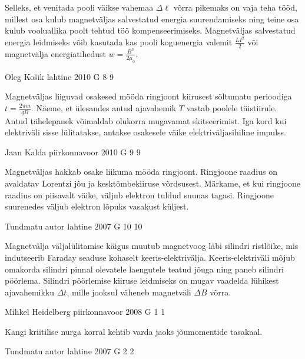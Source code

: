 \documentclass[11pt]{article}
\begin{document}
{{\ifHint
Selleks, et venitada pooli väikse vahemaa $\Delta \ell$ võrra pikemaks on vaja teha tööd, millest osa kulub magnetväljas salvestatud energia suurendamiseks ning teine osa kulub vooluallika poolt tehtud töö kompenseerimiseks. Magnetväljas salvestatud energia leidmiseks võib kasutada kas pooli koguenergia valemit $\frac{LI^2}{2}$ või magnetvälja energiatihedust $w = \frac{B^2}{2\mu_0}$.
\fi
}

{Oleg Košik} %
{lahtine} %
{2010} %
{G 8} %
{9} %
{

\ifHint
Magnetväljas liiguvad osakesed mööda ringjoont kiirusest sõltumatu perioodiga $t = \frac{2\pi m}{qB}$. Näeme, et ülesandes antud ajavahemik $T$ vastab poolele täistiirule. Antud tähelepanek võimaldab olukorra mugavamat skitseerimist. Iga kord kui elektriväli sisse lülitatakse, antakse osakesele väike elektriväljasihiline impulss.
\fi
}

{Jaan Kalda} %
{piirkonnavoor} %
{2010} %
{G 9} %
{9} %
{

\ifHint
Magnetväljas hakkab osake liikuma mööda ringjoont. Ringjoone raadius on avaldatav Lorentzi jõu ja kesktõmbekiiruse võrdsusest.
Märkame, et kui ringjoone raadius on piisavalt väike, väljub elektron tuldud suunas tagasi. Ringjoone suurenedes väljub elektron lõpuks vasakust küljest.
\fi
}

{Tundmatu autor} %
{lahtine} %
{2007} %
{G 10} %
{10} %
{

\ifHint
Magnetvälja väljalülitamise käigus muutub magnetvoog läbi silindri ristlõike, mis indutseerib Faraday seaduse kohaselt keeris-elektrivälja. Keeris-elektriväli mõjub omakorda silindri pinnal olevatele laengutele teatud jõuga ning paneb silindri pöörlema. Silindri pöörlemise kiiruse leidmiseks on mugav vaadelda lühikest ajavahemikku $\Delta t$, mille jooksul väheneb magnetväli $\Delta B$ võrra.
\fi
}

{Mihkel Heidelberg} %
{piirkonnavoor} %
{2008} %
{G 1} %
{1} %
{

\ifHint
Kangi kriitilise nurga korral kehtib varda jaoks jõumomentide tasakaal.
\fi
}

{Tundmatu autor} %
{lahtine} %
{2007} %
{G 2} %
{2} %
{

}}
\end{document}
